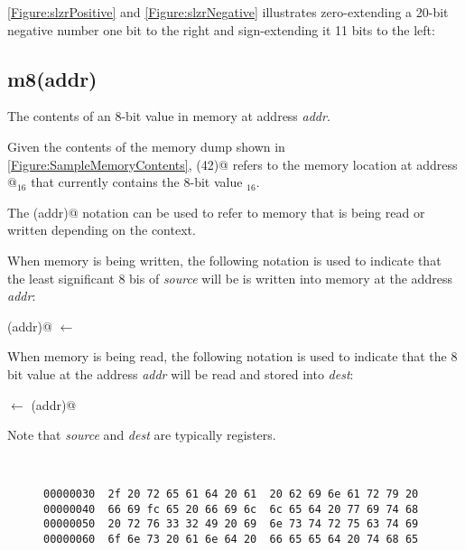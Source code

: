 \autoref{Figure:slzrPositive} and \autoref{Figure:slzrNegative}
illustrates zero-extending a 20-bit negative number one bit to the right 
and sign-extending it 11 bits to the left:

\begin{figure}[ht]
\centering
{}
\label{Figure:slzrPositive}
\end{figure}

\begin{figure}[ht]
\centering
{}
\label{Figure:slzrNegative}
\end{figure}


\subsection{m8(addr)}
\label{memory:m8}

The contents of an 8-bit value in memory at address {\em addr}.

Given the contents of the memory dump shown in 
\autoref{Figure:SampleMemoryContents}, 
(42)@ refers to the memory location at address @$_{16}$ 
that currently contains the 8-bit value \verb@fc@$_{16}$.

The \verb@mn(addr)@ notation can be used to refer to memory that is being 
read or written depending on the context.  

When memory is being written, the following notation is used to indicate that 
the least significant 8 bis of {\em source} will be is written into memory at 
the address {\em addr}:

(addr)@ $\leftarrow$ \verb@source@

When memory is being read, the following notation is used to indicate that the 
8 bit value at the address {\em addr} will be read and stored into {\em dest}:

\verb@dest@ $\leftarrow$ (addr)@ 

Note that {\em source} and {\em dest} are typically registers.
 

\begin{figure}[ht]
\centering
\begin{BVerbatim}


00000030  2f 20 72 65 61 64 20 61  20 62 69 6e 61 72 79 20
00000040  66 69 fc 65 20 66 69 6c  6c 65 64 20 77 69 74 68
00000050  20 72 76 33 32 49 20 69  6e 73 74 72 75 63 74 69
00000060  6f 6e 73 20 61 6e 64 20  66 65 65 64 20 74 68 65
\end{BVerbatim}
\label{Figure:SampleMemoryContents}
\end{figure}

